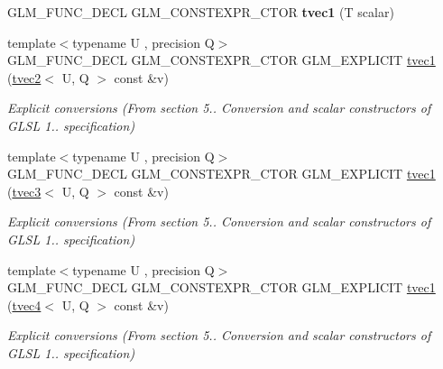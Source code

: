 \begin{DoxyCompactItemize}
G\+L\+M\+\_\+\+F\+U\+N\+C\+\_\+\+D\+E\+CL G\+L\+M\+\_\+\+C\+O\+N\+S\+T\+E\+X\+P\+R\+\_\+\+C\+T\+OR {\bfseries tvec1} (T scalar)
\item 
\mbox{\label{structglm_1_1tvec1_ae0c4ccec3b42ad5594f8e8870395ac49}} 
{\footnotesize template$<$typename U , precision Q$>$ }\\G\+L\+M\+\_\+\+F\+U\+N\+C\+\_\+\+D\+E\+CL G\+L\+M\+\_\+\+C\+O\+N\+S\+T\+E\+X\+P\+R\+\_\+\+C\+T\+OR G\+L\+M\+\_\+\+E\+X\+P\+L\+I\+C\+IT \hyperlink{structglm_1_1tvec1_ae0c4ccec3b42ad5594f8e8870395ac49}{tvec1} (\hyperlink{structglm_1_1tvec2}{tvec2}$<$ U, Q $>$ const \&v)
\begin{DoxyCompactList}\small\item\em Explicit conversions (From section 5.. Conversion and scalar constructors of G\+L\+SL 1.. specification) \end{DoxyCompactList}\item 
\mbox{\label{structglm_1_1tvec1_a8975bff3a3ce2e9be8205f94d54330aa}} 
{\footnotesize template$<$typename U , precision Q$>$ }\\G\+L\+M\+\_\+\+F\+U\+N\+C\+\_\+\+D\+E\+CL G\+L\+M\+\_\+\+C\+O\+N\+S\+T\+E\+X\+P\+R\+\_\+\+C\+T\+OR G\+L\+M\+\_\+\+E\+X\+P\+L\+I\+C\+IT \hyperlink{structglm_1_1tvec1_a8975bff3a3ce2e9be8205f94d54330aa}{tvec1} (\hyperlink{structglm_1_1tvec3}{tvec3}$<$ U, Q $>$ const \&v)
\begin{DoxyCompactList}\small\item\em Explicit conversions (From section 5.. Conversion and scalar constructors of G\+L\+SL 1.. specification) \end{DoxyCompactList}\item 
\mbox{\label{structglm_1_1tvec1_a9d01781ad635defad3e1fd64f02fda63}} 
{\footnotesize template$<$typename U , precision Q$>$ }\\G\+L\+M\+\_\+\+F\+U\+N\+C\+\_\+\+D\+E\+CL G\+L\+M\+\_\+\+C\+O\+N\+S\+T\+E\+X\+P\+R\+\_\+\+C\+T\+OR G\+L\+M\+\_\+\+E\+X\+P\+L\+I\+C\+IT \hyperlink{structglm_1_1tvec1_a9d01781ad635defad3e1fd64f02fda63}{tvec1} (\hyperlink{structglm_1_1tvec4}{tvec4}$<$ U, Q $>$ const \&v)
\begin{DoxyCompactList}\small\item\em Explicit conversions (From section 5.. Conversion and scalar constructors of G\+L\+SL 1.. specification) \end{DoxyCompactList}\item 

\end{DoxyCompactItemize}
